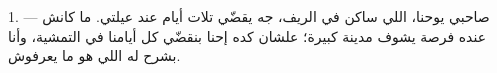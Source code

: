 %
%
%
%
%
%
%
%
%

\VUsaut{4.0mm}
\VUsaut{3.0mm}

\VUsaut{3.0mm}

1. --- صاحبي يوحنا، اللي ساكن في الريف، جه يقضّي تلات أيام عند عيلتي.
 ما كانش عنده فرصة يشوف مدينة كبيرة؛ علشان كده إحنا بنقضّي
كل أيامنا في التمشية، وأنا بشرح له اللي هو ما يعرفوش.

